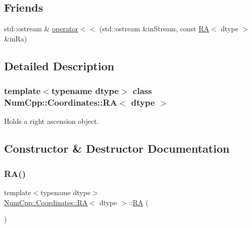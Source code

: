 \subsection*{Friends}
\begin{DoxyCompactItemize}
\item 
std\+::ostream \& \mbox{\hyperlink{class_num_cpp_1_1_coordinates_1_1_r_a_acba639d6020d3614a9cf1d47587c30fa}{operator$<$$<$}} (std\+::ostream \&in\+Stream, const \mbox{\hyperlink{class_num_cpp_1_1_coordinates_1_1_r_a}{RA}}$<$ dtype $>$ \&in\+Ra)
\end{DoxyCompactItemize}


\subsection{Detailed Description}
\subsubsection*{template$<$typename dtype$>$\newline
class Num\+Cpp\+::\+Coordinates\+::\+R\+A$<$ dtype $>$}

Holds a right ascension object. 

\subsection{Constructor \& Destructor Documentation}
\mbox{\label{class_num_cpp_1_1_coordinates_1_1_r_a_acf346f1d91b2bca6e8a0dcc65e55fee9}} 
\subsubsection{\texorpdfstring{R\+A()}{RA()}\hspace{0.1cm}{\footnotesize\ttfamily [1/3]}}
{\footnotesize\ttfamily template$<$typename dtype$>$ \\
\mbox{\hyperlink{class_num_cpp_1_1_coordinates_1_1_r_a}{Num\+Cpp\+::\+Coordinates\+::\+RA}}$<$ dtype $>$\+::\mbox{\hyperlink{class_num_cpp_1_1_coordinates_1_1_r_a}{RA}} (\begin{DoxyParamCaption}{ }\end{DoxyParamCaption})\hspace{0.3cm}{\ttfamily [inline]}}

